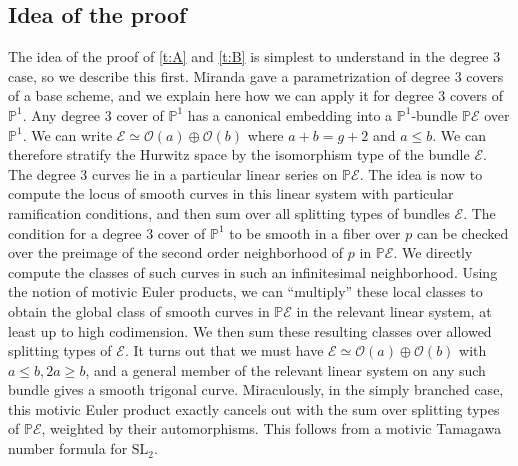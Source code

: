 \documentclass[12 pt]{amsart}
\theoremstyle{plain}
\theoremstyle{definition}
\theoremstyle{remark}
\numberwithin{equation}{section}
\newcommand\bp{\mathbb P}
\newcommand\sce{\mathscr E}
\newcommand\sco{\mathscr O}
\renewcommand\sl{\mathrm{SL}}
\begin{document}
\subsection{Idea of the proof}

The idea of the proof of \autoref{t:A} and \autoref{t:B} is simplest to understand in
the degree $3$ case, so we describe this first.  Miranda \cite{miranda:triple-covers-in-algebraic-geometry}
gave a parametrization of degree $3$ covers of a base scheme, and we explain here how we can apply it
for degree $3$ covers of $\bp^1$.
Any degree $3$ cover of $\bp^1$ has a canonical embedding into a $\bp^1$-bundle
$\bp \sce$ over $\bp^1$.
We can write $\sce \simeq \sco(a) \oplus \sco(b)$ where $a + b = g + 2$ and
$a \leq b$.
We can therefore stratify the Hurwitz space by the isomorphism type of the
bundle $\sce$.
The degree $3$ curves lie in a particular linear series on $\bp \sce$.
The idea is now to compute the locus of smooth curves in this linear system with
particular ramification conditions, and then sum over all splitting types of
bundles $\sce$.
The condition for a degree $3$ cover of $\bp^1$ to be smooth in a fiber over $p$ can be
checked over the preimage of the second order neighborhood of $p$ in $\bp \sce$.
We directly compute the classes of such curves in such an infinitesimal
neighborhood.
Using the notion of motivic Euler products, we can “multiply” these local
classes to obtain the global class of smooth curves in $\bp \sce$
in the relevant linear system, at least up to high codimension.
We then sum these resulting classes over allowed splitting types of $\sce$.
It turns out that we must have $\sce \simeq \sco(a) \oplus \sco(b)$ with 
$a \leq b, 2a \geq b$, and a general member of the relevant linear system on any
such bundle gives a smooth trigonal curve.
Miraculously, in the simply branched case, this motivic Euler product exactly
cancels out with the sum over splitting types of $\bp \sce$, weighted by their
automorphisms. This follows from a motivic Tamagawa number formula for $\sl_2$.
\end{document}
